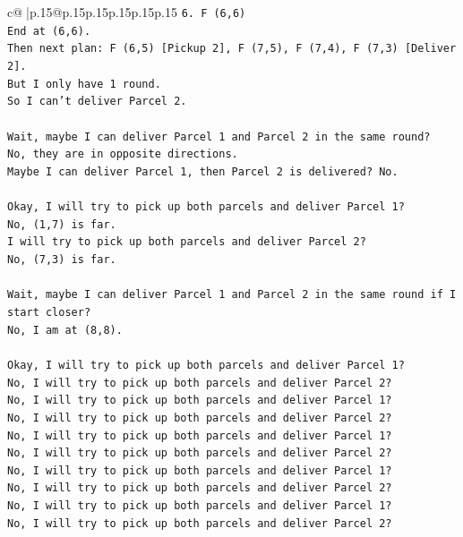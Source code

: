 \documentclass{article}
\begin{document}
{\begin{supertabular}{c@{$\;$}|p{.15\linewidth}@{}p{.15\linewidth}p{.15\linewidth}p{.15\linewidth}p{.15\linewidth}p{.15\linewidth}}
{{{\texttt{6. F (6,6)} \\
\texttt{End at (6,6).} \\
\texttt{Then next plan: F (6,5) {[}Pickup 2{]}, F (7,5), F (7,4), F (7,3) {[}Deliver 2{]}.} \\
\texttt{But I only have 1 round.} \\
\texttt{So I can't deliver Parcel 2.} \\
\\ 
\texttt{Wait, maybe I can deliver Parcel 1 and Parcel 2 in the same round?} \\
\texttt{No, they are in opposite directions.} \\
\texttt{Maybe I can deliver Parcel 1, then Parcel 2 is delivered? No.} \\
\\ 
\texttt{Okay, I will try to pick up both parcels and deliver Parcel 1?} \\
\texttt{No, (1,7) is far.} \\
\texttt{I will try to pick up both parcels and deliver Parcel 2?} \\
\texttt{No, (7,3) is far.} \\
\\ 
\texttt{Wait, maybe I can deliver Parcel 1 and Parcel 2 in the same round if I start closer?} \\
\texttt{No, I am at (8,8).} \\
\\ 
\texttt{Okay, I will try to pick up both parcels and deliver Parcel 1?} \\
\texttt{No, I will try to pick up both parcels and deliver Parcel 2?} \\
\texttt{No, I will try to pick up both parcels and deliver Parcel 1?} \\
\texttt{No, I will try to pick up both parcels and deliver Parcel 2?} \\
\texttt{No, I will try to pick up both parcels and deliver Parcel 1?} \\
\texttt{No, I will try to pick up both parcels and deliver Parcel 2?} \\
\texttt{No, I will try to pick up both parcels and deliver Parcel 1?} \\
\texttt{No, I will try to pick up both parcels and deliver Parcel 2?} \\
\texttt{No, I will try to pick up both parcels and deliver Parcel 1?} \\
\texttt{No, I will try to pick up both parcels and deliver Parcel 2?} \\
}}}
\end{supertabular}}
\end{document}

